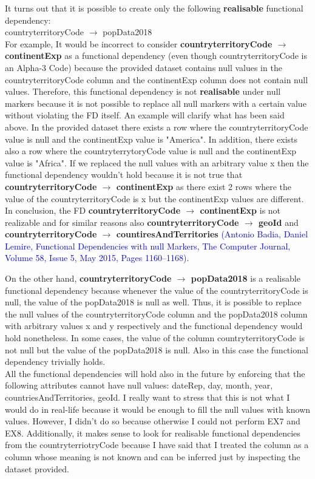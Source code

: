 \documentclass{article}
\begin{document}
It turns out that it is possible to create only the following  \textbf{realisable} functional dependency:\\ countryterritoryCode $\rightarrow$ popData2018\\
For example, It would be incorrect to consider \textbf{countryterritoryCode $\rightarrow$ continentExp} as a functional dependency (even though countryterritoryCode is an Alpha-3 Code) because the provided dataset  contains null values in the countryterritoryCode column and the continentExp column does not contain null values. Therefore, this functional dependency is not \textbf{realisable} under null markers because it is not possible to replace all null markers with a certain value without violating the FD itself.
An example will clarify what has been said above.
In the provided dataset  there exists a row where the countryterritoryCode value is null and the continentExp value is "America". In addition, there exists also a row where the countryterrytoryCode value is null and the continentExp value is "Africa". If we replaced the null values with an arbitrary value x then the functional dependency wouldn't hold because it is not true that \textbf{countryterritoryCode $\rightarrow$ continentExp} as there exist 2 rows where the value of the countryterritoryCode is x but the continentExp values are different. In conclusion, the FD \textbf{countryterritoryCode $\rightarrow$ continentExp} is not realizable and for similar reasons also \textbf{countryterritoryCode $\rightarrow$ geoId} and \textbf{countryterritoryCode $\rightarrow$ countiresAndTerritories} \textcolor{blue}{(Antonio Badia, Daniel Lemire, Functional Dependencies with null Markers, The Computer Journal, Volume 58, Issue 5, May 2015, Pages 1160–1168)}. 

On the other hand, \textbf{countryterritoryCode $\rightarrow$ popData2018} is a realisable functional dependency because whenever the value of the countryterritoryCode is null, the value of the popData2018 is null as well. Thus, it is possible to replace the null values of the countryterritoryCode column and the popData2018 column with arbitrary values x and y respectively and the functional dependency would hold nonetheless. In some cases, the value of the column countryterritoryCode is not null but the value of the popData2018 is null. Also in this case the functional dependency trivially holds.\\
All the functional dependencies will hold also in the future by enforcing that the following attributes cannot have null values: dateRep, day, month, year, countriesAndTerritories, geoId.
I really want to stress that this is not what I would do in real-life because it would be enough to fill the null values with known values. However, I didn't do so because otherwise I could not perform EX7 and EX8. Additionally, it makes sense to look for realisable functional dependencies from the countryterriotryCode because I have said that I treated the column as a column whose meaning is not known and can be inferred just by inspecting the dataset provided.
\end{document}
